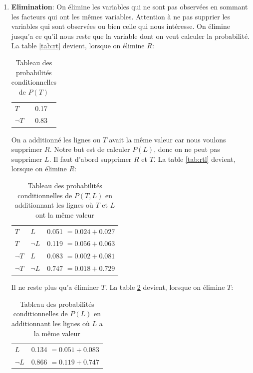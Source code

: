 \begin{enumerate}
\begin{table}[H]
            \caption{Tableau des probabilités conditionnelles de $P(R, T, L)$}
            \label{tab:rtl} 
        \end{table}
    \item \textbf{Elimination}: On élimine les variables qui ne sont pas observées en sommant les facteurs qui ont les mêmes variables. 
        Attention à ne pas supprier les variables qui sont observées ou bien celle qui nous intéresse.
        On élimine jusqu'a ce qu'il nous reste que la variable dont on veut calculer la probabilité.
        La table \ref{tab:rt} devient, lorsque on élimine $R$:
        \begin{table}[H]
            \centering
            \begin{tabular}{|l|l|}
                \hline
                $T$ & 0.17 \\ 
                $\neg T$ & 0.83 \\
                \hline
            \end{tabular}
            \caption{Tableau des probabilités conditionnelles de $P(T)$}
            \label{tab:t}
        \end{table}
        On a additionné les lignes ou $T$ avait la même valeur car nous voulons supprimer $R$.
        Notre but est de calculer $P(L)$, donc on ne peut pas supprimer $L$. Il faut d'abord supprimer $R$ et $T$.
        La table \ref{tab:rtl} devient, lorsque on élimine $R$: 
        \begin{table}[H]
            \centering
            \begin{tabular}{|l|l|l|}
                \hline
                $T$ & $L$ & 0.051 $= 0.024 + 0.027$ \\
                $T$ & $\neg L$ & 0.119 $= 0.056 + 0.063$\\
                $\neg T$ & $L$ & 0.083 $= 0.002 + 0.081$\\
                $\neg T$ & $\neg L$ & 0.747 $= 0.018 + 0.729$\\
                \hline
            \end{tabular}
            \caption{Tableau des probabilités conditionnelles de $P(T, L)$ en additionnant les lignes où $T$ et $L$ ont la même valeur}
            \label{tab:tl} 
        \end{table}
        Il ne reste plus qu'a éliminer $T$. La table \ref{tab:tl} devient, lorsque on élimine $T$:
        \begin{table}[H]
            \centering
            \begin{tabular}{|l|l|}
                \hline
                $L$ & 0.134 $= 0.051 + 0.083$ \\
                $\neg L$ & 0.866 $= 0.119 + 0.747$\\
                \hline
            \end{tabular}
            \caption{Tableau des probabilités conditionnelles de $P(L)$ en additionnant les lignes où $L$ a la même valeur}
            \label{tab:l} 
        \end{table}




\end{enumerate}



